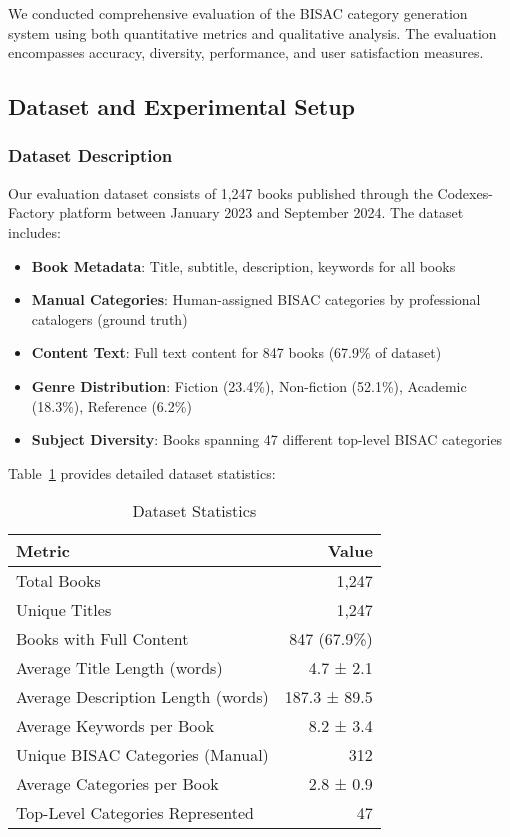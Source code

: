 \documentclass{article}
\begin{document}
We conducted comprehensive evaluation of the BISAC category generation system using both quantitative metrics and qualitative analysis. The evaluation encompasses accuracy, diversity, performance, and user satisfaction measures.

\subsection{Dataset and Experimental Setup}

\subsubsection{Dataset Description}

Our evaluation dataset consists of 1,247 books published through the Codexes-Factory platform between January 2023 and September 2024. The dataset includes:

\begin{itemize}
\item \textbf{Book Metadata}: Title, subtitle, description, keywords for all books
\item \textbf{Manual Categories}: Human-assigned BISAC categories by professional catalogers (ground truth)
\item \textbf{Content Text}: Full text content for 847 books (67.9\% of dataset)
\item \textbf{Genre Distribution}: Fiction (23.4\%), Non-fiction (52.1\%), Academic (18.3\%), Reference (6.2\%)
\item \textbf{Subject Diversity}: Books spanning 47 different top-level BISAC categories
\end{itemize}

Table~\ref{tab:dataset_stats} provides detailed dataset statistics:

\begin{table}[ht]
\centering
\caption{Dataset Statistics}
\label{tab:dataset_stats}
\begin{tabular}{@{}lr@{}}
\toprule
Metric & Value \\
\midrule
Total Books & 1,247 \\
Unique Titles & 1,247 \\
Books with Full Content & 847 (67.9\%) \\
Average Title Length (words) & 4.7 ± 2.1 \\
Average Description Length (words) & 187.3 ± 89.5 \\
Average Keywords per Book & 8.2 ± 3.4 \\
Unique BISAC Categories (Manual) & 312 \\
Average Categories per Book & 2.8 ± 0.9 \\
Top-Level Categories Represented & 47 \\
\bottomrule
\end{tabular}
\end{table}
\end{document}
